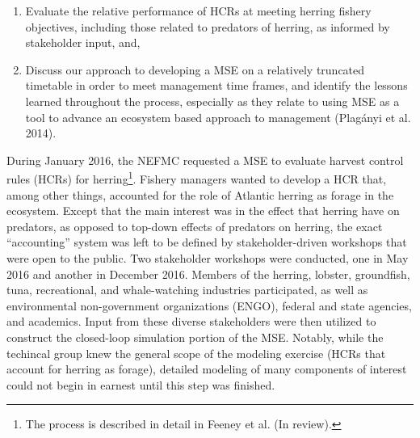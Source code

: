 \documentclass[]{article}
\let\rmarkdownfootnote\footnote%
\def\footnote{\protect\rmarkdownfootnote}
\begin{document}
\begin{enumerate}
\def\labelenumi{\arabic{enumi}.}
\item
  Evaluate the relative performance of HCRs at meeting herring fishery
  objectives, including those related to predators of herring, as
  informed by stakeholder input, and,
\item
  Discuss our approach to developing a MSE on a relatively truncated
  timetable in order to meet management time frames, and identify the
  lessons learned throughout the process, especially as they relate to
  using MSE as a tool to advance an ecosystem based approach to
  management (Plagányi et al. 2014).
\end{enumerate}

During January 2016, the NEFMC requested a MSE to evaluate harvest
control rules (HCRs) for herring\footnote{The process is described in
  detail in Feeney et al. (In review).}. Fishery managers wanted to
develop a HCR that, among other things, accounted for the role of
Atlantic herring as forage in the ecosystem. Except that the main
interest was in the effect that herring have on predators, as opposed to
top-down effects of predators on herring, the exact ``accounting''
system was left to be defined by stakeholder-driven workshops that were
open to the public. Two stakeholder workshops were conducted, one in May
2016 and another in December 2016. Members of the herring, lobster,
groundfish, tuna, recreational, and whale-watching industries
participated, as well as environmental non-government organizations
(ENGO), federal and state agencies, and academics. Input from these
diverse stakeholders were then utilized to construct the closed-loop
simulation portion of the MSE. Notably, while the techincal group knew
the general scope of the modeling exercise (HCRs that account for
herring as forage), detailed modeling of many components of interest
could not begin in earnest until this step was finished.
\end{document}
